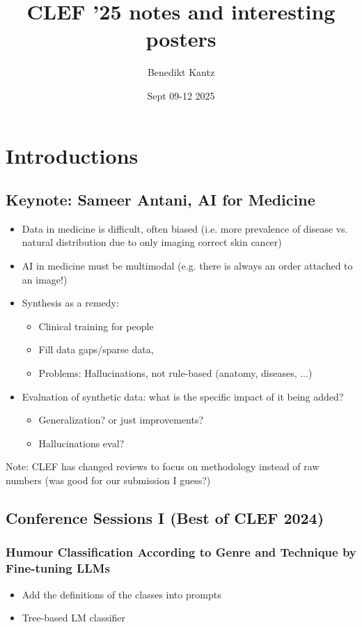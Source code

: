 \documentclass[a4paper]{article}
\title{CLEF '25 notes and interesting posters}
\author{Benedikt Kantz}
\date{Sept 09-12 2025}
\begin{document}
\maketitle
\tableofcontents
\section{Introductions}
\subsection{Keynote: Sameer Antani, AI for Medicine}
\begin{itemize}
    \item Data in medicine is difficult, often biased (i.e. more prevalence of disease vs. natural distribution due to only imaging correct skin cancer)
    \item AI in medicine must be multimodal (e.g. there is always an order attached to an image!)
    \item Synthesis as a remedy:
          \begin{itemize}
              \item Clinical training for people
              \item Fill data gaps/sparse data,
              \item Problems: Hallucinations, not rule-based (anatomy, diseases, ...)
          \end{itemize}
    \item Evaluation of synthetic data: what is the specific impact of it being added?
          \begin{itemize}
              \item Generalization? or just improvements?
              \item Hallucinations eval?
          \end{itemize}
\end{itemize}
Note: CLEF has changed reviews to focus on methodology instead of raw numbers (was good for our submission I guess?)
\subsection{Conference Sessions I (Best of CLEF 2024)}
\subsubsection{Humour Classification According to Genre and Technique by Fine-tuning LLMs}
\begin{itemize}
    \item Add the definitions of the classes into prompts
    \item Tree-based  LM classifier
\end{itemize}
\end{document}

